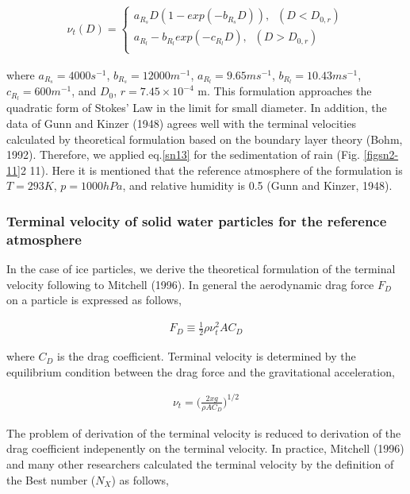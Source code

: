 \begin{eqnarray}
\nu_{t}(D)=
\left\{
\begin{array}{l}
a_{R_{s}}D(1-exp(-b_{R_{s}}D)),\;\;(D<D_{0,r}) \\
a_{R_{l}}-b_{R_{l}}exp(-c_{R_{l}}D),\;\;(D>D_{0,r}) \\
\label{sn13}
\end{array}
\right.
\end{eqnarray}

where $a_{R_{s}} = 4000 s^{-1}$, $b_{R_{s}}=12000 m^{-1}$, $a_{R_{l}}=9.65 m s^{-1}$, $b_{R_{l}} = 10.43 m s^{-1}$, $c_{R_{l}} = 600 m^{-1}$, and $D_{0}$, $r=7.45\times10^{-4}$ m. This formulation approaches the quadratic form of Stokes’ Law in the limit for small diameter. In addition, the data of Gunn and Kinzer (1948) agrees well with the terminal velocities calculated by theoretical formulation based on the boundary layer theory (Bohm, 1992). Therefore, we applied eq.\ref{sn13} for the sedimentation of rain (Fig. \ref{figsn2-11}2 11). Here it is mentioned that the reference atmosphere of the formulation is $T = 293 K$, $p = 1000hPa$, and relative humidity is 0.5 (Gunn and Kinzer, 1948).

\subsubsection{Terminal velocity of solid water particles for the reference atmosphere}
In the case of ice particles, we derive the theoretical formulation of the terminal velocity following to Mitchell (1996). In general the aerodynamic drag force $F_{D}$ on a particle is expressed as follows,

\begin{eqnarray}
F_{D}\equiv \frac{1}{2}\rho\nu_{t}^{2}AC_{D}
\label{sn14}
\end{eqnarray}

where $C_{D}$ is the drag coefficient. Terminal velocity is determined by the equilibrium condition between the drag force and the gravitational acceleration,

\begin{eqnarray}
\nu_{t}=\bigl(\frac{2xg}{\rho AC_{D}}\bigr)^{1/2}
\label{sn15}
\end{eqnarray}

The problem of derivation of the terminal velocity is reduced to derivation of the drag coefficient indepenently on the terminal velocity. In practice, Mitchell (1996) and many other researchers calculated the terminal velocity by the definition of the Best number ($N_{X}$) as follows,

